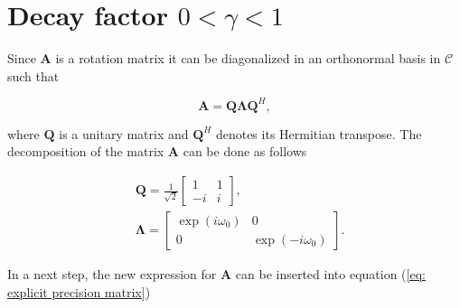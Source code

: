 \documentclass[11pt,a4paper,twoside]{report}
\newcommand{\mat}[1]{\mathbf{#1}}
\begin{document}
\section*{Decay factor $0<\gamma< 1$ }

Since $\mat{A}$ is a rotation matrix it can be diagonalized in an orthonormal basis in $\mathcal{C}$ such that

\begin{equation}
	\mat{A} = \mat{Q\Lambda}\mat{Q}^H,
\end{equation}

where $\mat{Q}$ is a unitary matrix and $\mat{Q}^H$ denotes  its Hermitian transpose. The decomposition of the matrix $\mat{A}$ can be done as follows

\begin{align*}
	&\mat{Q} = \frac{1}{\sqrt{2}}
		\begin{bmatrix}
			1 & 1 \\
			-i & i
		\end{bmatrix},
	\\
	&\mat{\Lambda} = 
		\begin{bmatrix}
			\exp{(i\omega_0)} & 0 \\
			0 & \exp{(-i\omega_0)}
		\end{bmatrix}.
\end{align*}


In a next step, the new expression for $\mat{A}$ can be inserted into equation (\ref{eq: explicit precision matrix}) \cite{ST:Malmberg}
\end{document}
